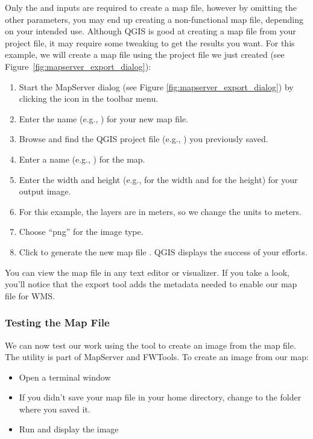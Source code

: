 Only the  and  inputs are 
required to create a map file, however by omitting the other parameters, 
you may end up creating a non-functional map file, depending on your intended use. 
Although QGIS is good at creating a map file from your project file, 
it may require some tweaking to get the results you want. 
For this example, we will create a map file using the project file 
 we just created 
(see Figure~\ref{fig:mapserver_export_dialog}):

\begin{enumerate}
  \item  Start the MapServer dialog (see 
Figure \ref{fig:mapserver_export_dialog}) by clicking the  icon in the toolbar menu.
  \item Enter the name (e.g., ) for your new map file.
  \item Browse and find the QGIS project file (e.g., ) 
  you previously saved.
  \item Enter a name (e.g., ) for the map.
  \item Enter the width and height (e.g.,  for the width and  for the height) for your output image.
  \item For this example, the layers are in meters, so we change the units to meters.
  \item Choose ``png'' for the image type.
  \item Click  to generate the new map file . 
  QGIS displays the success of your efforts.
\end{enumerate}

You can view the map file in any text editor or visualizer. If you
take a look, you'll notice that the export tool adds the metadata needed
to enable our map file for WMS. 

\subsubsection{Testing the Map File}

We can now test our work using the  tool to create an image
from the map file. The  utility is part of MapServer and FWTools. 
To create an image from our map:

\begin{itemize}
\item Open a terminal window
\item If you didn't save your map file in your home directory, change to
  the folder where you saved it.
\item Run  and 
  display the image 
\end{itemize}
 
